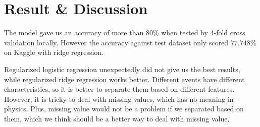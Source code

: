 \documentclass[10pt,conference,compsocconf]{IEEEtran}
\begin{document}







\section{Result \& Discussion}
The model gave us an accuracy of more than $80\%$ when tested by 4-fold cross validation locally. However the accuracy against test dataset only scored $77.748\%$ on Kaggle with ridge regression.


Regularized logistic regression unexpectedly did not give us the best results, while regularized ridge regression works better. Different events have different characteristics, so it is better to separate them based on different features. However, it is tricky to deal with missing values, which has no meaning in physics. Plus, missing value would not be a problem if we separated based on them, which we think should be a better way to deal with missing value.




\end{document}
